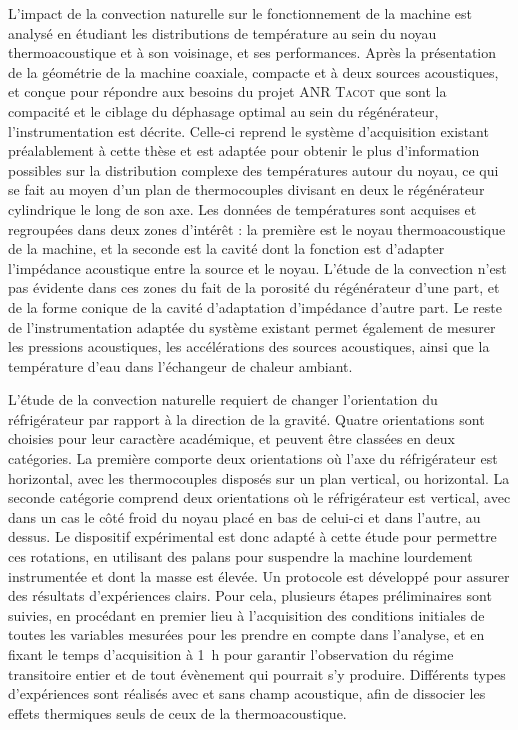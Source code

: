 L'impact de la convection naturelle sur le fonctionnement de la machine est analysé en étudiant les distributions de température au sein du noyau thermoacoustique et à son voisinage, et ses performances. Après la présentation de la géométrie de la machine coaxiale, compacte et à deux sources acoustiques, et conçue pour répondre aux besoins du projet ANR \textsc{Tacot} que sont la compacité et le ciblage du déphasage optimal au sein du régénérateur, l'instrumentation est décrite. Celle-ci reprend le système d'acquisition existant préalablement à cette thèse et est adaptée pour obtenir le plus d'information possibles sur la distribution complexe des températures autour du noyau, ce qui se fait au moyen d'un plan de thermocouples divisant en deux le régénérateur cylindrique le long de son axe. Les données de températures sont acquises et regroupées dans deux zones d'intérêt : la première est le noyau thermoacoustique de la machine, et la seconde est la cavité dont la fonction est d'adapter l'impédance acoustique entre la source et le noyau. L'étude de la convection n'est pas évidente dans ces zones du fait de la porosité du régénérateur d'une part, et de la forme conique de la cavité d'adaptation d'impédance d'autre part. Le reste de l'instrumentation adaptée du système existant permet également de mesurer les pressions acoustiques, les accélérations des sources acoustiques, ainsi que la température d'eau dans l'échangeur de chaleur ambiant.\medskip

L'étude de la convection naturelle requiert de changer l'orientation du réfrigérateur par rapport à la direction de la gravité. Quatre orientations sont choisies pour leur caractère académique, et peuvent être classées en deux catégories. La première comporte deux orientations où l'axe du réfrigérateur est horizontal, avec les thermocouples disposés sur un plan vertical, ou horizontal. La seconde catégorie comprend deux orientations où le réfrigérateur est vertical, avec dans un cas le côté froid du noyau placé en bas de celui-ci et dans l'autre, au dessus. Le dispositif expérimental est donc adapté à cette étude pour permettre ces rotations, en utilisant des palans pour suspendre la machine lourdement instrumentée et dont la masse est élevée. Un protocole est développé pour assurer des résultats d'expériences clairs. Pour cela, plusieurs étapes préliminaires sont suivies, en procédant en premier lieu à l'acquisition des conditions initiales de toutes les variables mesurées pour les prendre en compte dans l'analyse, et en fixant le temps d'acquisition à \qty{1}{\hour} pour garantir l'observation du régime transitoire entier et de tout évènement qui pourrait s'y produire. Différents types d'expériences sont réalisés avec et sans champ acoustique, afin de dissocier les effets thermiques seuls de ceux de la thermoacoustique.\medskip



